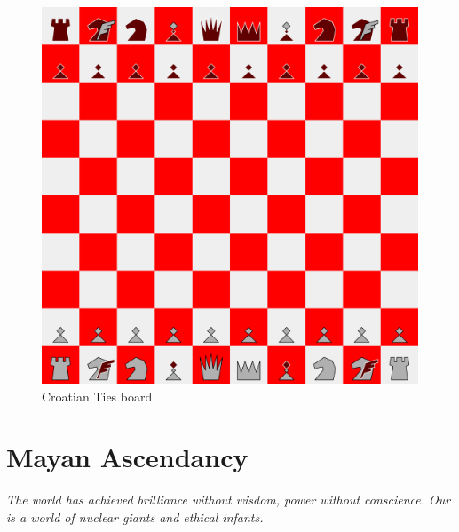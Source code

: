 \documentclass[a5paper,12pt,draft]{book} %
\begin{document}
\noindent
\begin{figure}[h]
\includegraphics[width=1.0\textwidth, keepaspectratio=true]{../gfx/boards/04_croatian_ties.png}
\caption{Croatian Ties board}
\label{fig:croatian_ties}
\end{figure}

\clearpage

\chapter*{Mayan Ascendancy}

\begin{flushright}
\parbox{0.8\textwidth}{
\emph{The world has achieved brilliance without wisdom, power without
conscience. Our is a world of nuclear giants and ethical infants. \\
 } }
\end{flushright}
\end{document}
